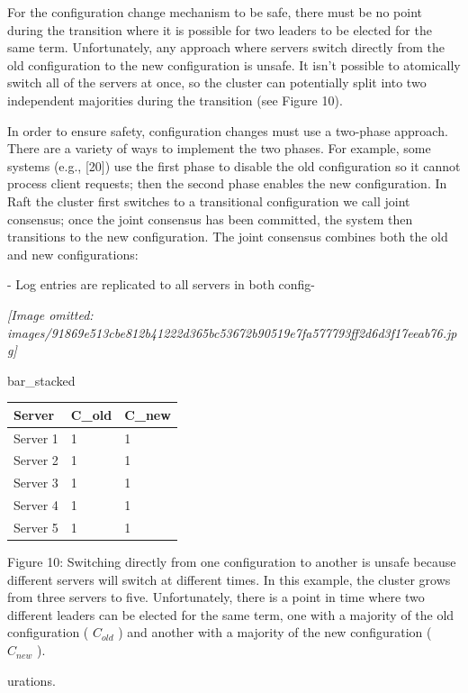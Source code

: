 \documentclass[
]{article}
\newcounter{none} %
\begin{document}
For the configuration change mechanism to be safe, there must be no
point during the transition where it is possible for two leaders to be
elected for the same term. Unfortunately, any approach where servers
switch directly from the old configuration to the new configuration is
unsafe. It isn't possible to atomically switch all of the servers at
once, so the cluster can potentially split into two independent
majorities during the transition (see Figure 10).

In order to ensure safety, configuration changes must use a two-phase
approach. There are a variety of ways to implement the two phases. For
example, some systems (e.g., {[}20{]}) use the first phase to disable
the old configuration so it cannot process client requests; then the
second phase enables the new configuration. In Raft the cluster first
switches to a transitional configuration we call joint consensus; once
the joint consensus has been committed, the system then transitions to
the new configuration. The joint consensus combines both the old and new
configurations:

- Log entries are replicated to all servers in both config-

\textit{[Image omitted: images/91869e513cbe812b41222d365bc53672b90519e7fa577793ff2d6d3f17eeab76.jpg]}

bar\_stacked

{\def\LTcaptype{none} %
\begin{longtable}[]{@{}lll@{}}
\toprule\noalign{}
Server & C\_old & C\_new \\
\midrule\noalign{}
\endhead
\bottomrule\noalign{}
\endlastfoot
Server 1 & 1 & 1 \\
Server 2 & 1 & 1 \\
Server 3 & 1 & 1 \\
Server 4 & 1 & 1 \\
Server 5 & 1 & 1 \\
\end{longtable}
}

Figure 10: Switching directly from one configuration to another is
unsafe because different servers will switch at different times. In this
example, the cluster grows from three servers to five. Unfortunately,
there is a point in time where two different leaders can be elected for
the same term, one with a majority of the old configuration (
\(C_{old}\) ) and another with a majority of the new configuration (
\(C_{new}\) ).

urations.
\end{document}
